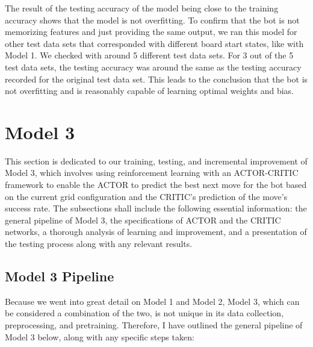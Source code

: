 \documentclass[11pt]{article}
\begin{document}
The result of the testing accuracy of the model being close to the training accuracy shows that the model is not overfitting. To confirm that the bot is not memorizing features and just providing the same output, we ran this model for other test data sets that corresponded with different board start states, like with Model 1. We checked with around 5 different test data sets. For 3 out of the 5 test data sets, the testing accuracy was around the same as the testing accuracy recorded for the original test data set. This leads to the conclusion that the bot is not overfitting and is reasonably capable of learning optimal weights and bias. 

\section{Model 3}

This section is dedicated to our training, testing, and incremental improvement of Model 3, which involves using reinforcement learning with an ACTOR-CRITIC framework to enable the ACTOR to predict the best next move for the bot based on the current grid configuration and the CRITIC's prediction of the move's success rate. The subsections shall include the following essential information: the general pipeline of Model 3, the specifications of ACTOR and the CRITIC networks, a thorough analysis of learning and improvement, and a presentation of the testing process along with any relevant results.

\subsection{Model 3 Pipeline}

Because we went into great detail on Model 1 and Model 2, Model 3, which can be considered a combination of the two, is not unique in its data collection, preprocessing, and pretraining. Therefore, I have outlined the general pipeline of Model 3 below, along with any specific steps taken:
\end{document}
